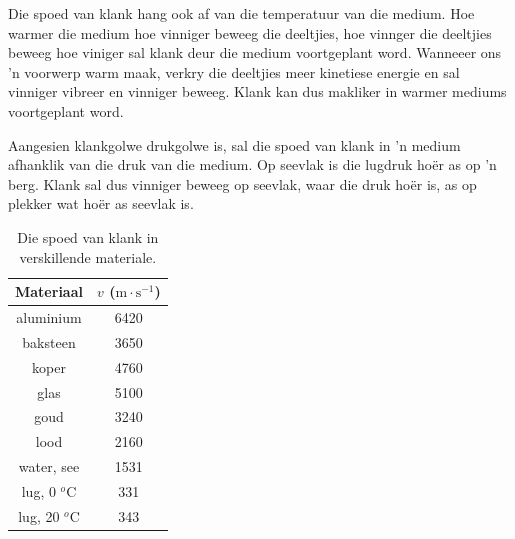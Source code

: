 
\begin{minipage}[t]{.5\textwidth}
Die spoed van klank hang ook af van die temperatuur van die medium. Hoe warmer die medium hoe vinniger beweeg die deeltjies, hoe vinnger die deeltjies beweeg hoe viniger sal klank deur die medium voortgeplant word. Wanneeer ons  'n voorwerp warm maak, verkry die deeltjies meer kinetiese energie en sal vinniger vibreer en vinniger beweeg. Klank kan dus makliker in warmer mediums voortgeplant word.\par  

Aangesien klankgolwe drukgolwe is, sal die spoed van klank in  'n medium afhanklik van die druk van die medium. Op seevlak is die lugdruk ho\"{e}r as op  'n berg. Klank sal dus vinniger beweeg op seevlak, waar die druk ho\"{e}r is, as op plekker wat ho\"{e}r as seevlak is.  
\end{minipage}
\begin{minipage}[t]{.5\textwidth}
\begin{center}
\begin{table}[H]
\centering
 \begin{tabular}{|c|c|}\hline
Materiaal	& $v$ ($\text{m}\cdot \text{s}^{-1}$)\\ \hline \hline
aluminium	&6420 \\ \hline
baksteen	&3650 \\ \hline
koper	&4760	 	 \\ \hline
glas &5100	 \\ \hline 	 	 
goud	&3240	 \\ \hline 	
lood	&2160	 \\ \hline 
water, see	&1531 \\ \hline
lug, 0 $^o$C&331 \\ \hline
lug, 20 $^o$C&343 \\ \hline
\end{tabular}
\caption{Die spoed van klank in verskillende materiale.}
\end{table}
\end{center}
\end{minipage}

